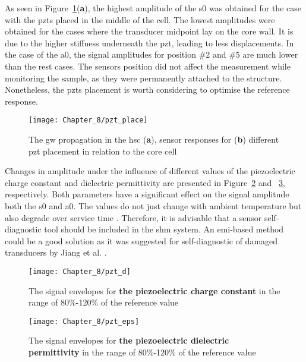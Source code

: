 As seen in Figure~\ref{fig:pzt_place}(\textbf{a}), the highest amplitude of the \ac{s0} was obtained for the case with the \acp{pzt} placed in the middle of the cell.
The lowest amplitudes were obtained for the cases where the transducer midpoint lay on the core wall.
It is due to the higher stiffness underneath the \ac{pzt}, leading to less displacements.
In the case of the \ac{a0}, the signal amplitudes for position \#2 and \#5 are much lower than the rest cases.
The sensors position did not affect the measurement while monitoring the sample, as they were permanently attached to the structure. 
Nonetheless, the \acp{pzt} placement is worth considering to optimise the reference response.
\begin{figure}[!tbh]
	\begin{center}
		\texttt{[image: Chapter\_8/pzt\_place]}
	\end{center}
	\caption{The \acl{gw} propagation in the \acl{hsc} (\textbf{a}), sensor responses for (\textbf{b}) different \acf{pzt} placement in relation to the core cell}
	\label{fig:pzt_place}
\end{figure}

Changes in amplitude under the influence of different values of the piezoelectric charge constant and dielectric permittivity are presented in Figure~\ref{fig:pzt_d} and ~\ref{fig:pzt_eps}, respectively.
Both parameters have a significant effect on the signal amplitude both the \ac{s0} and \ac{a0}.
The values do not just change with ambient temperature but also degrade over service time \cite{barzegar2001aging, deangelis2006p2o}.
Therefore, it is advisable that a sensor self-diagnostic tool should be included in the \ac{shm} system. 
An \ac{emi}-based method could be a good solution as it was suggested for self-diagnostic of damaged transducers by Jiang et al. \cite{jiang2021electromechanical}.

\begin{figure}[!tbh]
	\begin{center}
		\texttt{[image: Chapter\_8/pzt\_d]}
	\end{center}
	\caption{The signal envelopes for \textbf{the piezoelectric charge constant} in the range of 80\%-120\% of the reference value}
	\label{fig:pzt_d}
\end{figure}

\begin{figure}[!tbh]
	\begin{center}
		\texttt{[image: Chapter\_8/pzt\_eps]}
	\end{center}
	\caption{The signal envelopes for \textbf{the piezoelectric dielectric permittivity} in the range of 80\%-120\% of the reference value}
	\label{fig:pzt_eps}
\end{figure}

